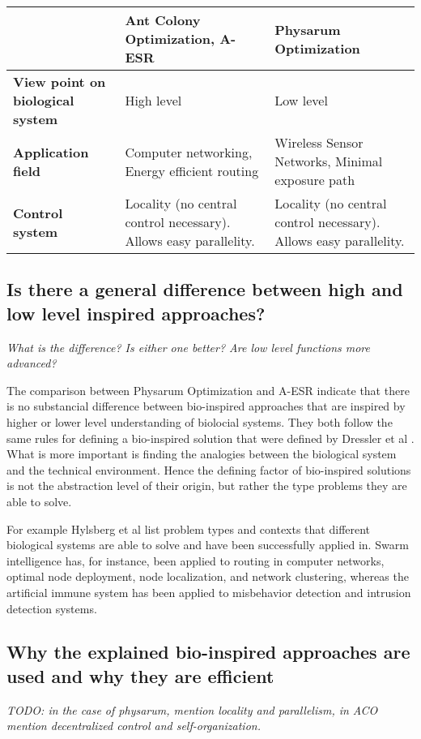 \documentclass{IWORK2014}
\begin{document}
\begin{tabularx}{\linewidth}{|X|X|X|}
\hline & \textbf{Ant Colony Optimization, A-ESR} & \textbf{Physarum Optimization} \\ \hline
\textbf{View point on biological system} & High level & Low level \\ \hline
\textbf{Application field} & Computer networking, Energy efficient routing & Wireless Sensor Networks, Minimal exposure path \\ \hline
\textbf{Control system} & Locality (no central control necessary). Allows easy parallelity. & Locality (no central control necessary). Allows easy parallelity. \\ \hline
\end{tabularx}

\subsection{Is there a general difference between high and low level inspired approaches?}
\textit{What is the difference? Is either one better? Are low level functions more advanced?}

The comparison between Physarum Optimization and A-ESR indicate that there is no substancial difference between bio-inspired approaches that are inspired by higher or lower level understanding of biolocial systems. They both follow the same rules for defining a bio-inspired solution that were defined by Dressler et al \cite{dressler2010bio}. What is more important is finding the analogies between the biological system and the technical environment. Hence the defining factor of bio-inspired solutions is not the abstraction level of their origin, but rather the type problems they are able to solve.

For example Hylsberg et al \cite{hylsberg2011bioinspired} list problem types and contexts that different biological systems are able to solve and have been successfully applied in. Swarm intelligence has, for instance, been applied to routing in computer networks, optimal node deployment, node localization, and network clustering, whereas the artificial immune system has been applied to misbehavior detection and intrusion detection systems.

\subsection{Why the explained bio-inspired approaches are used and why they are efficient}
\textit{TODO: in the case of physarum, mention locality and parallelism, in ACO mention decentralized control and self-organization.}
\end{document}

